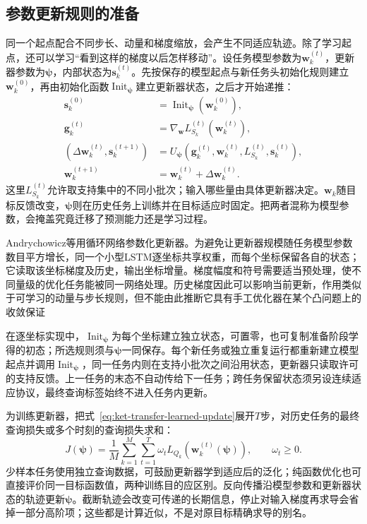 \subsection{参数更新规则的准备}
\label{sec:ket-transfer-learned-optimizer}

同一个起点配合不同步长、动量和梯度缩放，会产生不同适应轨迹。除了学习起点，还可以学习“看到这样的梯度以后怎样移动”。设任务模型参数为$\bm w_k^{(t)}$，更新器参数为$\bm\psi$，内部状态为$\bm s_k^{(t)}$。先按保存的模型起点与新任务头初始化规则建立$\bm w_k^{(0)}$，再由初始化函数$\operatorname{Init}_{\bm\psi}$建立更新器状态，之后才开始递推：
\begin{align}
  \bm s_k^{(0)}
    &=\operatorname{Init}_{\bm\psi}(\bm w_k^{(0)}), \nonumber\\
  \bm g_k^{(t)}
    &=\nabla_{\bm w}L_{S_k}^{(t)}(\bm w_k^{(t)}), \nonumber\\
  (\Delta\bm w_k^{(t)},\bm s_k^{(t+1)})
    &=U_{\bm\psi}(\bm g_k^{(t)},\bm w_k^{(t)},
             L_{S_k}^{(t)},\bm s_k^{(t)}), \nonumber\\
  \bm w_k^{(t+1)}
    &=\bm w_k^{(t)}+\Delta\bm w_k^{(t)}.
  \label{eq:ket-transfer-learned-update}
\end{align}
这里$L_{S_k}^{(t)}$允许取支持集中的不同小批次；输入哪些量由具体更新器决定。$\bm w_k$随目标反馈改变，$\bm\psi$则在历史任务上训练并在目标适应时固定。把两者混称为模型参数，会掩盖究竟迁移了预测能力还是学习过程。

Andrychowicz等用循环网络参数化更新器。为避免让更新器规模随任务模型参数数目平方增长，同一个小型LSTM逐坐标共享权重，而每个坐标保留各自的状态；它读取该坐标梯度及历史，输出坐标增量。梯度幅度和符号需要适当预处理，使不同量级的优化任务能被同一网络处理。历史梯度因此可以影响当前更新，作用类似于可学习的动量与步长规则，但不能由此推断它具有手工优化器在某个凸问题上的收敛保证

在逐坐标实现中，$\operatorname{Init}_{\bm\psi}$为每个坐标建立独立状态，可置零，也可复制准备阶段学得的初态；所选规则须与$\bm\psi$一同保存。每个新任务或独立重复运行都重新建立模型起点并调用$\operatorname{Init}_{\bm\psi}$，同一任务内则在支持小批次之间沿用状态，更新器只读取许可的支持反馈。上一任务的末态不自动传给下一任务；跨任务保留状态须另设连续适应协议，最终查询标签始终不进入任务内更新。

为训练更新器，把式~\eqref{eq:ket-transfer-learned-update}展开$T$步，对历史任务的最终查询损失或多个时刻的查询损失求和：
\begin{equation}
  J(\bm\psi)=\frac1M\sum_{k=1}^{M}
       \sum_{t=1}^{T}\omega_t L_{Q_k}(\bm w_k^{(t)}(\bm\psi)),
       \qquad \omega_t\geq0.
  \label{eq:ket-transfer-optimizer-objective}
\end{equation}
少样本任务使用独立查询数据，可鼓励更新器学到适应后的泛化；纯函数优化也可直接评价同一目标函数值，两种训练目的应区别。反向传播沿模型参数和更新器状态的轨迹更新$\bm\psi$。截断轨迹会改变可传递的长期信息，停止对输入梯度再求导会省掉一部分高阶项；这些都是计算近似，不是对原目标精确求导的别名。

